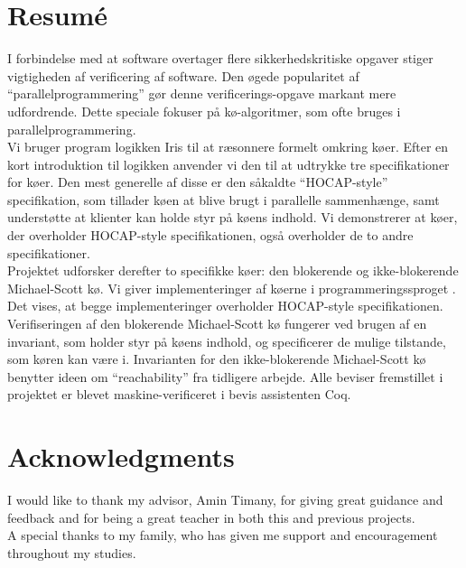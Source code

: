\documentclass[a4paper, 10pt]{report}
\theoremstyle{definition}
\begin{document}

\chapter*{Resum\'e}

I forbindelse med at software overtager flere sikkerhedskritiske opgaver stiger vigtigheden af verificering af software. Den øgede popularitet af ``parallelprogrammering'' gør denne verificerings-opgave markant mere udfordrende. Dette speciale fokuser på kø-algoritmer, som ofte bruges i parallelprogrammering.\\
Vi bruger program logikken Iris til at ræsonnere formelt omkring køer. Efter en kort introduktion til logikken anvender vi den til at udtrykke tre specifikationer for køer. Den mest generelle af disse er den såkaldte ``HOCAP-style'' specifikation, som tillader køen at blive brugt i parallelle sammenhænge, samt understøtte at klienter kan holde styr på køens indhold. Vi demonstrerer at køer, der overholder HOCAP-style specifikationen, også overholder de to andre specifikationer.\\
Projektet udforsker derefter to specifikke køer: den blokerende og ikke-blokerende Michael-Scott kø. Vi giver implementeringer af køerne i programmeringssproget \heaplang{}. Det vises, at begge implementeringer overholder HOCAP-style specifikationen. Verifiseringen af den blokerende Michael-Scott kø fungerer ved brugen af en invariant, som holder styr på køens indhold, og specificerer de mulige tilstande, som køren kan være i. Invarianten for den ikke-blokerende Michael-Scott kø benytter ideen om ``reachability'' fra tidligere arbejde. Alle beviser fremstillet i projektet er blevet maskine-verificeret i bevis assistenten Coq.


\chapter*{Acknowledgments}

I would like to thank my advisor, Amin Timany, for giving great guidance and feedback and for being a great teacher in both this and previous projects.\\
A special thanks to my family, who has given me support and encouragement throughout my studies.
\end{document}
